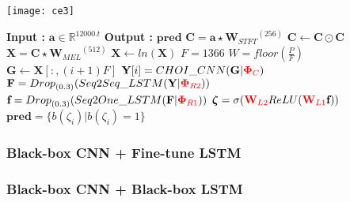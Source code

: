 \begin{algorithm}
\begin{minipage}{0.15\textwidth}
\texttt{[image: ce3]}
\end{minipage}
  \begin{minipage}{0.80\textwidth}
  \caption{$\textbf{pred}$ = $Model$($\textbf{a}$) }\label{exp:a4}
   {\fontsize{8}{0}
  \begin{algorithmic}[1]
    \Statex \textbf{Input :} $\textbf{a} \in \mathbb{R}^{12000.t}$
    \Statex \textbf{Output :} $\textbf{pred}$ 
    \State $\textbf{C} = \textbf{a} \star {\textbf{W}_{STFT}}^{(256)}$ 
    \State $\textbf{C} \leftarrow \textbf{C} \odot \textbf{C}$
    \State $\textbf{X} = \textbf{C} \star {\textbf{W}_{MEL}}^{(512)}$ 
    \State $\textbf{X} \leftarrow ln(\textbf{X})$
    \State $F = 1366$
    \State $W = floor(\frac{P}{F})$
      \State $ \textbf{G} \leftarrow \textbf{X}[:,(i+1)F]$
      \State $\textbf{Y}[i] = CHOI\_CNN(\textbf{G} | {\color{red} \bm{\Phi}_{C}})$ 
     \EndFor
     \State $\textbf{F} = {Drop}_{(0.3)}(Seq2Seq\_LSTM(\textbf{Y} | {\color{red}\bm{\Phi}_{R2}} ))$ 
    \State $\textbf{f} = {Drop}_{(0.3)}(Seq2One\_LSTM(\textbf{F} | {\color{red}\bm{\Phi}_{R1}}))$ 
    \State $\bm{\zeta} = \sigma ({\color{red} \textbf{W}_{L2}} ReLU ({\color{red}\textbf{W}_{L1}}\textbf{f})) $ 
    \State $\textbf{pred} = \{ b(\zeta_{i}) | b(\zeta_{i}) = 1 \}$ 
  \end{algorithmic}
  }
  \end{minipage}
\end{algorithm}
\FloatBarrier

\subsubsection{Black-box CNN + Fine-tune LSTM}
\subsubsection{Black-box CNN + Black-box LSTM}

